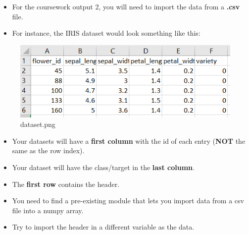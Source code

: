 \documentclass[11pt]{article}
\makeatletter
\def\maxwidth{\ifdim\Gin@nat@width>\linewidth\linewidth
    \else\Gin@nat@width\fi}
\let\Oldincludegraphics\includegraphics
\renewcommand{\includegraphics}[1]{\Oldincludegraphics[width=.8\maxwidth]{#1}}
\providecommand{\tightlist}{%
      \setlength{\itemsep}{0pt}\setlength{\parskip}{0pt}}
\makeatother
\begin{document}
    \begin{itemize}
\tightlist
\item
  For the coursework output 2, you will need to import the data from a
  \textbf{.csv} file.
\end{itemize}

    \begin{itemize}
\tightlist
\item
  For instance, the IRIS dataset would look something like this:
\end{itemize}

    \begin{figure}
\centering
\includegraphics{figs/dataset.png}
\caption{dataset.png}
\end{figure}

    \begin{itemize}
\tightlist
\item
  Your datasets will have a \textbf{first column} with the id of each
  entry (\textbf{NOT} the same as the row index).
\end{itemize}

    \begin{itemize}
\tightlist
\item
  Your dataset will have the class/target in the \textbf{last column}.
\end{itemize}

    \begin{itemize}
\tightlist
\item
  The \textbf{first row} contains the header.
\end{itemize}

    \begin{itemize}
\tightlist
\item
  You need to find a pre-existing module that lets you import data from
  a csv file into a numpy array.
\end{itemize}

    \begin{itemize}
\tightlist
\item
  Try to import the header in a different variable as the data.
\end{itemize}
\end{document}
